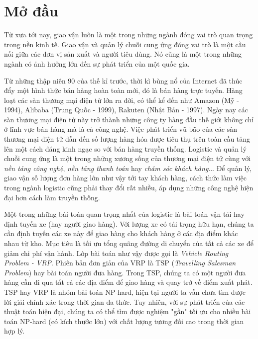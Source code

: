 \chapter*{Mở đầu}
\label{chap:introduction}

Từ xưa tới nay, giao vận luôn là một trong những ngành đóng vai trò quan trọng trong nền kinh tế. Giao vận và quản lý chuỗi cung ứng đóng vai trò là một cầu nối giữa các đơn vị sản xuất và người tiêu dùng. Nó cũng là một trong những ngành có ảnh hưởng lớn đến sự phát triển của một quốc gia. 

Từ những thập niên 90 của thế kỉ trước, thời kì bùng nổ của Internet đã thúc đẩy một hình thức bán hàng hoàn toàn mới, đó là bán hàng trực tuyến. Hàng loạt các sàn thương mại điện tử lớn ra đời, có thể kể đến như Amazon (Mỹ - 1994), Alibaba (Trung Quốc - 1999), Rakuten (Nhật Bản - 1997). Ngày nay các sàn thương mại điện tử này trở thành những công ty hàng đầu thế giới không chỉ ở lĩnh vực bán hàng mà là cả công nghệ. Việc phát triển vũ bão của các sàn thương mại điện tử dẫn đến số lượng hàng hóa được tiêu thụ trên toàn cầu tăng lên một cách đáng kinh ngạc so với bán hàng truyền thống. Logistic và quản lý chuỗi cung ứng là một trong những xương sống của thương mại điện tử cùng với \textit{nền tảng công nghệ}, \textit{nền tảng thanh toán} hay \textit{chăm sóc khách hàng}... Để quản lý, giao vận số lượng đơn hàng lớn như vậy tới tay khách hàng, cách thức làm việc trong ngành logistic cũng phải thay đổi rất nhiều, áp dụng những công nghệ hiện đại hơn cách làm truyền thống.

Một trong những bài toán quan trọng nhất của logistic là bài toán vận tải hay định tuyến xe (hay người giao hàng). Với lượng xe có tải trọng hữu hạn, chúng ta cần định tuyến các xe này để giao hàng cho khách hàng ở các địa điểm khác nhau từ kho. Mục tiêu là tối ưu tổng quãng đường di chuyển của tất cả các xe để giảm chi phí vận hành. Lớp bài toán như vậy được gọi là \textit{Vehicle Routing Problem - VRP}. Phiên bản đơn giản của VRP là TSP (\textit{Travelling Salesman Problem}) hay bài toán người đưa hàng. Trong TSP, chúng ta có một người đưa hàng cần đi qua tất cả các địa điểm để giao hàng và quay trở về điểm xuất phát. TSP hay VRP là nhóm bài toán NP-hard, hiện tại người ta vẫn chưa tìm được lời giải chính xác trong thời gian đa thức. Tuy nhiên, với sự phát triển của các thuật toán hiện đại, chúng ta có thể tìm được nghiệm "gần" tối ưu cho nhiều bài toán NP-hard (có kích thước lớn) với chất lượng tương đối cao trong thời gian hợp lý.

